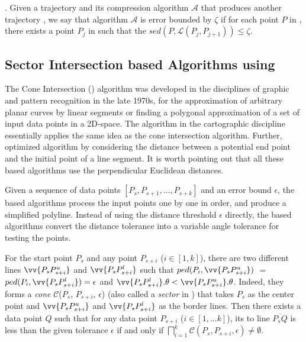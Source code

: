 . Given a trajectory  and its compression  algorithm $\mathcal{A}$ that produces another trajectory ,
we say that algorithm $\mathcal{A}$ is error bounded by $\zeta$ if  for each point $P$ in , there exists a point $P_j$ in  such that the  $sed(P, \mathcal{L}(P_j,P_{j+1}))\le \zeta$.






\subsection{Sector Intersection based Algorithms using \ped}
\label{sub-ci-ped}


The Cone Intersection (\cia) algorithm \cite{Williams:Longest, Sklansky:Cone} was developed in the disciplines of graphic and pattern recognition in the late 1970s, for the approximation of arbitrary planar curves by linear segments or finding a polygonal approximation of a set of input data points in a 2D-space. The \sleeve algorithm \cite{Zhao:Sleeve} in the cartographic discipline essentially applies the same idea as the cone intersection algorithm.
Further, \cite{Dunham:Cone}  optimized algorithm \cia by considering the distance between a potential end point and the initial point of a line segment. It is worth pointing out that all these \cia based algorithms use the perpendicular Euclidean distances.


Given a sequence of data points $[P_{s}, P_{s+1}, \ldots, P_{s+k}]$ and an error bound $\epsilon$, the \cia based algorithms process the input points one by one in order, and produce a simplified polyline.  Instead of using the distance threshold $\epsilon$ directly, the \cia based algorithms convert the distance tolerance into a variable angle tolerance for testing the points.

For the start point $P_s$ and any point $P_{s+i}$ ($i\in[1, k]$), there are two different lines $\vv{P_sP^u_{s+i}}$ and $\vv{P_sP^l_{s+i}}$ such that $ped(P_i, \vv{P_sP^u_{s+i}})$ $=$ $ped(P_i, \vv{P_sP^l_{s+i}}) = \epsilon$ and $\vv{P_sP^l_{s+i}}.\theta < \vv{P_sP^u_{s+i}}.\theta$. Indeed, they forms a \emph{cone} $\mathcal{C}$($P_s$, $P_{s+i}$, $\epsilon$) (also called a \emph{sector} in \sleeve \cite{Zhao:Sleeve}) that takes $P_s$ as the center point and $\vv{P_sP^u_{s+i}}$ and $\vv{P_sP^l_{s+i}}$ as the border lines.
Then there exists a data point $Q$ such that for any data point $P_{s+i}$ ($i \in [1, ... k]$), its \ped to
line $\overline{P_sQ}$ is less than the given \ped tolerance $\epsilon$ if and only if $\bigsqcap_{i=1}^{k}\mathcal{C}(P_s, P_{s+i}, \epsilon) \ne \emptyset$.

